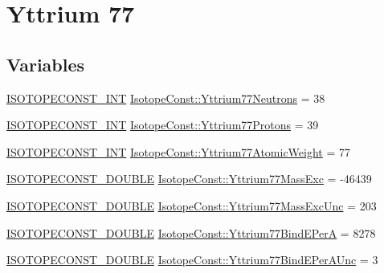 \hypertarget{group___isotope_const-_yttrium-_y77}{}\section{Yttrium 77}
\label{group___isotope_const-_yttrium-_y77}
\subsection*{Variables}
\begin{DoxyCompactItemize}
\item 
\mbox{\hyperlink{group___isotope_const-_macros_ga5f18360b3e99483a35c32d789e62621c}{I\+S\+O\+T\+O\+P\+E\+C\+O\+N\+S\+T\+\_\+\+I\+NT}} \mbox{\hyperlink{group___isotope_const-_yttrium-_y77_gabff31de53bf30befc494396183b6be03}{Isotope\+Const\+::\+Yttrium77\+Neutrons}} = 38
\item 
\mbox{\hyperlink{group___isotope_const-_macros_ga5f18360b3e99483a35c32d789e62621c}{I\+S\+O\+T\+O\+P\+E\+C\+O\+N\+S\+T\+\_\+\+I\+NT}} \mbox{\hyperlink{group___isotope_const-_yttrium-_y77_ga4b8574f0391eda87818aa156e08ab194}{Isotope\+Const\+::\+Yttrium77\+Protons}} = 39
\item 
\mbox{\hyperlink{group___isotope_const-_macros_ga5f18360b3e99483a35c32d789e62621c}{I\+S\+O\+T\+O\+P\+E\+C\+O\+N\+S\+T\+\_\+\+I\+NT}} \mbox{\hyperlink{group___isotope_const-_yttrium-_y77_ga6f65736c26bd58e526c51975f538ddd0}{Isotope\+Const\+::\+Yttrium77\+Atomic\+Weight}} = 77
\item 
\mbox{\hyperlink{group___isotope_const-_macros_ga8f45a7272ce02c0b4c65c44636ed719a}{I\+S\+O\+T\+O\+P\+E\+C\+O\+N\+S\+T\+\_\+\+D\+O\+U\+B\+LE}} \mbox{\hyperlink{group___isotope_const-_yttrium-_y77_gad6ab81b3c2e82c7bf55a696b14ce125a}{Isotope\+Const\+::\+Yttrium77\+Mass\+Exc}} = -\/46439
\item 
\mbox{\hyperlink{group___isotope_const-_macros_ga8f45a7272ce02c0b4c65c44636ed719a}{I\+S\+O\+T\+O\+P\+E\+C\+O\+N\+S\+T\+\_\+\+D\+O\+U\+B\+LE}} \mbox{\hyperlink{group___isotope_const-_yttrium-_y77_gae7967e7ed27850b8ef462752b950bda6}{Isotope\+Const\+::\+Yttrium77\+Mass\+Exc\+Unc}} = 203
\item 
\mbox{\hyperlink{group___isotope_const-_macros_ga8f45a7272ce02c0b4c65c44636ed719a}{I\+S\+O\+T\+O\+P\+E\+C\+O\+N\+S\+T\+\_\+\+D\+O\+U\+B\+LE}} \mbox{\hyperlink{group___isotope_const-_yttrium-_y77_ga4774b8037f9957305cc32aefd0bb6b93}{Isotope\+Const\+::\+Yttrium77\+Bind\+E\+PerA}} = 8278
\item 
\mbox{\hyperlink{group___isotope_const-_macros_ga8f45a7272ce02c0b4c65c44636ed719a}{I\+S\+O\+T\+O\+P\+E\+C\+O\+N\+S\+T\+\_\+\+D\+O\+U\+B\+LE}} \mbox{\hyperlink{group___isotope_const-_yttrium-_y77_ga8db3095ebedc6255a3c0d54aa2c833a0}{Isotope\+Const\+::\+Yttrium77\+Bind\+E\+Per\+A\+Unc}} = 3

\end{DoxyCompactItemize}
